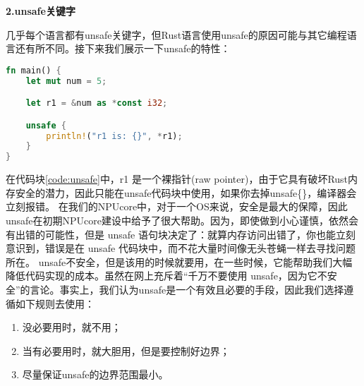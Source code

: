 \textbf{2.unsafe关键字}

几乎每个语言都有unsafe关键字，但Rust语言使用unsafe的原因可能与其它编程语言还有所不同。接下来我们展示一下unsafe的特性：
\begin{lstlisting}[language={Rust}, label={code:unsafe},
	caption={unsafe展示（r1 是一个裸指针）}]
fn main() {
    let mut num = 5;

    let r1 = &num as *const i32;

    unsafe {
        println!("r1 is: {}", *r1);
    }
}
\end{lstlisting}
在代码块\ref{code:unsafe}中，r1 是一个裸指针(raw pointer)，由于它具有破坏Rust内存安全的潜力，因此只能在unsafe代码块中使用，如果你去掉unsafe\{\}，编译器会立刻报错。
在我们的NPUcore中，对于一个OS来说，安全是最大的保障，因此unsafe在初期NPUcore建设中给予了很大帮助。因为，即使做到小心谨慎，依然会有出错的可能性，但是 unsafe 语句块决定了：就算内存访问出错了，你也能立刻意识到，错误是在 unsafe 代码块中，而不花大量时间像无头苍蝇一样去寻找问题所在。
unsafe不安全，但是该用的时候就要用，在一些时候，它能帮助我们大幅降低代码实现的成本。虽然在网上充斥着“千万不要使用 unsafe，因为它不安全”的言论。事实上，我们认为unsafe是一个有效且必要的手段，因此我们选择遵循如下规则去使用：
\begin{enumerate}
    \item 没必要用时，就不用；
    \item 当有必要用时，就大胆用，但是要控制好边界；
    \item 尽量保证unsafe的边界范围最小。
\end{enumerate}

